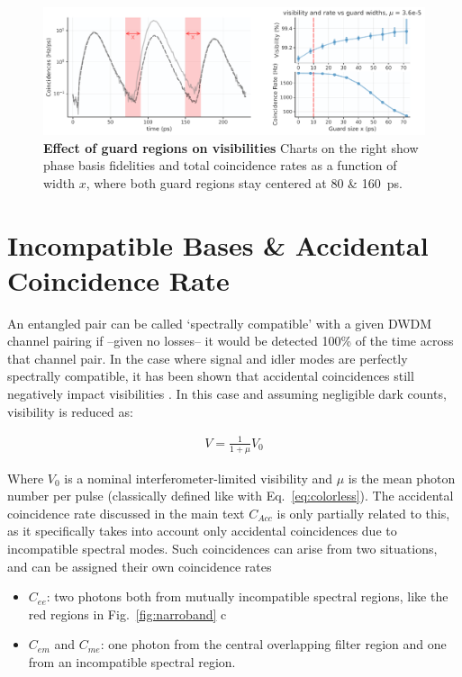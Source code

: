 \documentclass[11pt]{caltech_thesis} %
\begin{document}
\hypertarget{fig:guard_scan}{%
\begin{figure}
\centering
\includegraphics[width=1\textwidth,height=\textheight]{./chapter_05/figs/guard_scan_light.pdf}
\caption[{Effect of guard regions on visibilities}]{\textbf{Effect of guard regions on visibilities} Charts on the right show phase basis fidelities and total coincidence rates as a function of width $x$, where both guard regions stay centered at 80 \& 160~ps.}
\label{fig:guard_scan}
\end{figure}
}

\hypertarget{incompatible-bases-accidental-coincidence-rate}{%
\section{Incompatible Bases \& Accidental Coincidence Rate}\label{incompatible-bases-accidental-coincidence-rate}}

An entangled pair can be called `spectrally compatible' with a given DWDM channel pairing if --given no losses-- it would be detected 100\% of the time across that channel pair. In the case where signal and idler modes are perfectly spectrally compatible, it has been shown that accidental coincidences still negatively impact visibilities \autocite{Kim2022}. In this case and assuming negligible dark counts, visibility is reduced as:

$$
\begin{aligned}
V = \frac{1}{1+\mu}V_0
\end{aligned}
$$

Where $V_0$ is a nominal interferometer-limited visibility \autocite{Kim2022} and $\mu$ is the mean photon number per pulse (classically defined like with Eq.~\ref{eq:colorless}). The accidental coincidence rate discussed in the main text $C_{Acc}$ is only partially related to this, as it specifically takes into account only accidental coincidences due to incompatible spectral modes. Such coincidences can arise from two situations, and can be assigned their own coincidence rates

\begin{itemize}
\tightlist
\item
  $C_{ee}$: two photons both from mutually incompatible spectral regions, like the red regions in Fig.~\ref{fig:narroband} c
\item
  $C_{em}$ and $C_{me}$: one photon from the central overlapping filter region and one from an incompatible spectral region.
\end{itemize}
\end{document}
